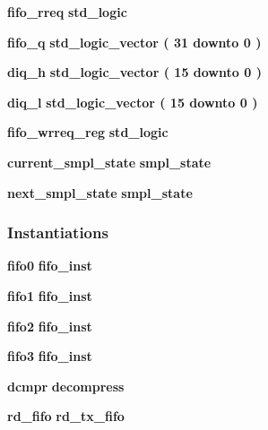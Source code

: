 \begin{DoxyCompactItemize}
\item 
{\bf fifo\+\_\+rreq} {\bfseries \textcolor{comment}{std\+\_\+logic}\textcolor{vhdlchar}{ }} 
\item 
{\bf fifo\+\_\+q} {\bfseries \textcolor{comment}{std\+\_\+logic\+\_\+vector}\textcolor{vhdlchar}{ }\textcolor{vhdlchar}{(}\textcolor{vhdlchar}{ }\textcolor{vhdlchar}{ } \textcolor{vhdldigit}{31} \textcolor{vhdlchar}{ }\textcolor{keywordflow}{downto}\textcolor{vhdlchar}{ }\textcolor{vhdlchar}{ } \textcolor{vhdldigit}{0} \textcolor{vhdlchar}{ }\textcolor{vhdlchar}{)}\textcolor{vhdlchar}{ }} 
\item 
{\bf diq\+\_\+h} {\bfseries \textcolor{comment}{std\+\_\+logic\+\_\+vector}\textcolor{vhdlchar}{ }\textcolor{vhdlchar}{(}\textcolor{vhdlchar}{ }\textcolor{vhdlchar}{ } \textcolor{vhdldigit}{15} \textcolor{vhdlchar}{ }\textcolor{keywordflow}{downto}\textcolor{vhdlchar}{ }\textcolor{vhdlchar}{ } \textcolor{vhdldigit}{0} \textcolor{vhdlchar}{ }\textcolor{vhdlchar}{)}\textcolor{vhdlchar}{ }} 
\item 
{\bf diq\+\_\+l} {\bfseries \textcolor{comment}{std\+\_\+logic\+\_\+vector}\textcolor{vhdlchar}{ }\textcolor{vhdlchar}{(}\textcolor{vhdlchar}{ }\textcolor{vhdlchar}{ } \textcolor{vhdldigit}{15} \textcolor{vhdlchar}{ }\textcolor{keywordflow}{downto}\textcolor{vhdlchar}{ }\textcolor{vhdlchar}{ } \textcolor{vhdldigit}{0} \textcolor{vhdlchar}{ }\textcolor{vhdlchar}{)}\textcolor{vhdlchar}{ }} 
\item 
{\bf fifo\+\_\+wrreq\+\_\+reg} {\bfseries \textcolor{comment}{std\+\_\+logic}\textcolor{vhdlchar}{ }} 
\item 
{\bf current\+\_\+smpl\+\_\+state} {\bfseries {\bfseries {\bf smpl\+\_\+state}} \textcolor{vhdlchar}{ }} 
\item 
{\bf next\+\_\+smpl\+\_\+state} {\bfseries {\bfseries {\bf smpl\+\_\+state}} \textcolor{vhdlchar}{ }} 
\end{DoxyCompactItemize}
\subsubsection*{Instantiations}
 \begin{DoxyCompactItemize}
\item 
{\bf fifo0}  {\bfseries fifo\+\_\+inst}   
\item 
{\bf fifo1}  {\bfseries fifo\+\_\+inst}   
\item 
{\bf fifo2}  {\bfseries fifo\+\_\+inst}   
\item 
{\bf fifo3}  {\bfseries fifo\+\_\+inst}   
\item 
{\bf dcmpr}  {\bfseries decompress}   
\item 
{\bf rd\+\_\+fifo}  {\bfseries rd\+\_\+tx\+\_\+fifo}   
\end{DoxyCompactItemize}


